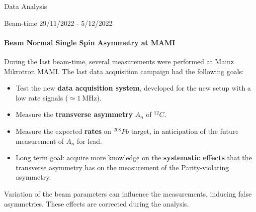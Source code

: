 \documentclass[9pt,a4paper]{beamer}
\newcommand{\commento}[1]{}
\begin{document}
\begin{frame}[noframenumbering]{Data Analysis}
\begin{center}
\end{center}
\end{frame}

\begin{frame}{Beam-time 29/11/2022 - 5/12/2022}
\framesubtitle{Beam Normal Single Spin Asymmetry at MAMI}
During the last beam-time, several measurements were performed at Mainz Mikrotron MAMI. The last data acquisition campaign had the following goals:

\begin{itemize}
\item Test the new \textbf{data acquisition system}, developed for the new setup with a low rate signals ($\simeq \SI{1}{\mega \hertz} $). 
\item Measure the \textbf{transverse asymmetry} $A_{n}$ of $^{12}C$.
\item Measure the expected \textbf{rates} on $^{208}Pb$ target, in anticipation of the future measurement of $A_{n}$ for lead. 
\item Long term goal: acquire more knowledge on the \textbf{systematic effects} that the transverse asymmetry has on the measurement of the Parity-violating asymmetry.
\end{itemize}

Variation of the beam parameters can influence the measurements, inducing false asymmetries. These effects are corrected during the analysis. 
\end{frame}


\commento{
\begin{frame}[t]{False Asymmetries}

Variation of the beam parameters can influence the measurements, inducing false asymmetries. The important parameters are:

\begin{itemize}
\item \textbf{X,Y} positions of the beam spot on the target.
\item beam current \textbf{I}.
\item beam energy \textbf{E}.
\item incident angles of the beam {$\bm{\theta_{x}},\bm{\theta_{y}}$}
\end{itemize}

Considering that the expected asymmetry is expected to be $\simeq 20 \, ppm$, small fluctuation of the beam correlated to the polarization can produce false asymmetries. The effects can be summarized by the model:
\begin{equation}
Asym = A_{physical} \cdot P + \delta_{I} + A_{x} \delta x + A_{y} \delta y + A_{\theta_{x}} \delta \theta_{x} + A_{\theta_{y}} \delta \theta_{y}+ A_{E} \delta E 
\end{equation}
\end{frame}}
\end{document}
